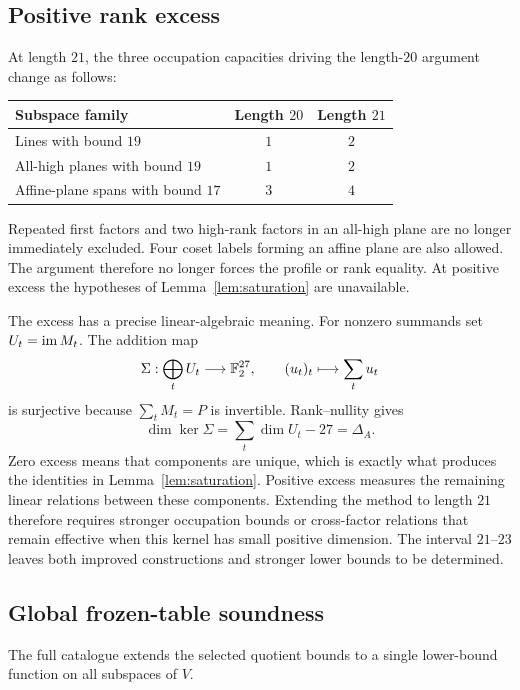 \subsection{Positive rank excess}
At length $21$, the three occupation capacities driving the
length-$20$ argument change as follows:
\begin{center}
\begin{tabular}{lcc}
\toprule
Subspace family & Length $20$ & Length $21$\\
\midrule
Lines with bound $19$ & $1$ & $2$\\
All-high planes with bound $19$ & $1$ & $2$\\
Affine-plane spans with bound $17$ & $3$ & $4$\\
\bottomrule
\end{tabular}
\end{center}
Repeated first factors and two high-rank factors in an all-high plane
are no longer immediately excluded. Four coset labels forming an affine
plane are also allowed. The argument therefore no longer forces the
profile or rank equality. At positive excess the hypotheses of
Lemma~\ref{lem:saturation} are unavailable.

The excess has a precise linear-algebraic meaning. For nonzero
summands set $U_t=\operatorname{im} M_t$. The addition map
\[
 \Sigma:\bigoplus_t U_t\longrightarrow\mathbb F_2^{27},\qquad
 (u_t)_t\longmapsto\sum_t u_t
\]
is surjective because $\sum_tM_t=P$ is invertible. Rank--nullity gives
\begin{equation}\label{eq:excess-kernel}
 \dim\ker\Sigma=\sum_t\dim U_t-27=\Delta_A.
\end{equation}
Zero excess means that components are unique, which is exactly what
produces the identities in Lemma~\ref{lem:saturation}. Positive excess
measures the remaining linear relations between these components.
Extending the method to length $21$ therefore requires stronger
occupation bounds or cross-factor relations that remain effective
when this kernel has small positive dimension.
The interval $21$--$23$ leaves both improved constructions and stronger
lower bounds to be determined.

\subsection{Global frozen-table soundness}
The full catalogue extends the selected quotient bounds to a single
lower-bound function on all subspaces of $V$.

